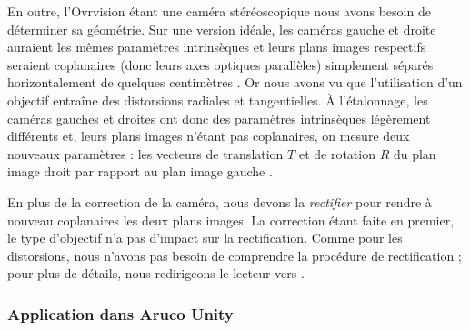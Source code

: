 En outre, l'Ovrvision étant une caméra stéréoscopique nous avons besoin de déterminer sa géométrie. Sur une version idéale, les caméras gauche et droite auraient les mêmes paramètres intrinsèques et leurs plans images respectifs seraient coplanaires (donc leurs axes optiques parallèles) simplement séparés horizontalement de quelques centimètres . Or nous avons vu que l'utilisation d'un objectif entraîne des distorsions radiales et tangentielles. À l'étalonnage, les caméras gauches et droites ont donc des paramètres intrinsèques légèrement différents et, leurs plans images n'étant pas coplanaires, on mesure deux nouveaux paramètres : les vecteurs de translation $T$ et de rotation $R$ du plan image droit par rapport au plan image gauche .

En plus de la correction de la caméra, nous devons la \emph{rectifier} pour rendre à nouveau coplanaires les deux plans images. La correction étant faite en premier, le type d'objectif n'a pas d'impact sur la rectification. Comme pour les distorsions, nous n'avons pas besoin de comprendre la procédure de rectification ; pour plus de détails, nous redirigeons le lecteur vers \cite[p. 419]{Bradski2008}.

\subsubsection{Application dans Aruco Unity}




